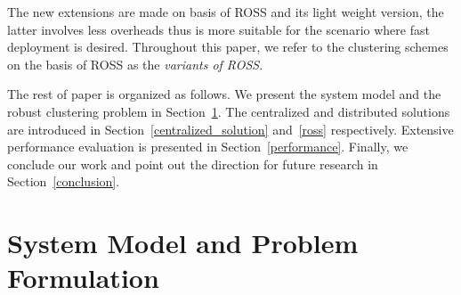 \documentclass[10pt,journal,compsoc]{IEEEtran}
\theoremstyle{mytheoremstyle}
\theoremstyle{mytheoremstyle}
\theoremstyle{mytheoremstyle}
\newcommand{\ie}{i.e., }
\begin{document}
%
The new extensions are made on basis of ROSS and its light weight version, the latter involves less overheads thus is more suitable for the scenario where fast deployment is desired.
Throughout this paper, we refer to the clustering schemes on the basis of ROSS as the \textit{variants of ROSS}.

The rest of paper is organized as follows. 
We present the system model and the robust clustering problem in Section~\ref{sec:model}. 
The centralized and distributed solutions are introduced in Section~\ref{centralized_solution} and~\ref{ross} respectively.
Extensive performance evaluation is presented in Section~\ref{performance}.
Finally, we conclude our work and point out the direction for future research in Section~\ref{conclusion}.



\section{System Model and Problem Formulation}
\label{sec:model}
\end{document}
